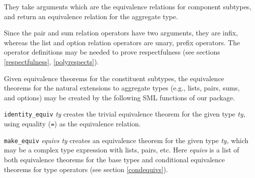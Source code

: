 \documentclass[envcountsame,runningheads]{llncs}
\newcommand{\quotient}{partial equivalence}
\begin{document}
They
take
arguments which are the
equivalence relations for component subtypes, and return
an equivalence relation for the aggregate type.

Since the pair and sum relation operators have two arguments,
they are infix, whereas the list and option relation operators
are unary, prefix operators.
The operator definitions
may be needed to prove respectfulness
(see sections \ref{respectfulness}, \ref{polyrespects}).

Given equivalence theorems for the constituent subtypes, the
equivalence theorems for the natural extensions to aggregate types (e.g.,
lists, pairs, sums, and options) may be created by the following
SML functions of our package.

\begin{center}
\end{center}

{\tt identity\_equiv} {\it ty\/} creates the trivial equivalence theorem for
the given type {\it ty,} using equality ({\tt =}) as the equivalence relation.

{\tt make\_equiv} {\it equivs ty\/} creates an equivalence
theorem for the given type {\it ty,}
which may be a complex type expression with lists, pairs, etc.
Here {\it equivs} is a list of both equivalence theorems
for the base types and conditional equivalence theorems for type operators
(see section \ref{condequivs}).
\end{document}
